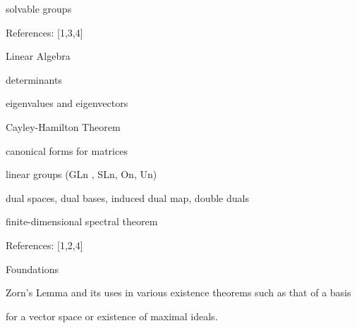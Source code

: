 \documentclass[a4paper,portrait,12pt]{article}
\begin{document}
\begin{flushleft}
solvable groups
\end{flushleft}


\begin{flushleft}
References: [1,3,4]
\end{flushleft}


\begin{flushleft}
Linear Algebra
\end{flushleft}


\begin{flushleft}
determinants
\end{flushleft}


\begin{flushleft}
eigenvalues and eigenvectors
\end{flushleft}


\begin{flushleft}
Cayley-Hamilton Theorem
\end{flushleft}


\begin{flushleft}
canonical forms for matrices
\end{flushleft}


\begin{flushleft}
linear groups (GLn , SLn, On, Un)
\end{flushleft}


\begin{flushleft}
dual spaces, dual bases, induced dual map, double duals
\end{flushleft}


\begin{flushleft}
finite-dimensional spectral theorem
\end{flushleft}


\begin{flushleft}
References: [1,2,4]
\end{flushleft}


\begin{flushleft}
Foundations
\end{flushleft}


\begin{flushleft}
Zorn's Lemma and its uses in various existence theorems such as that of a basis
\end{flushleft}


\begin{flushleft}
for a vector space or existence of maximal ideals.
\end{flushleft}
\end{document}
